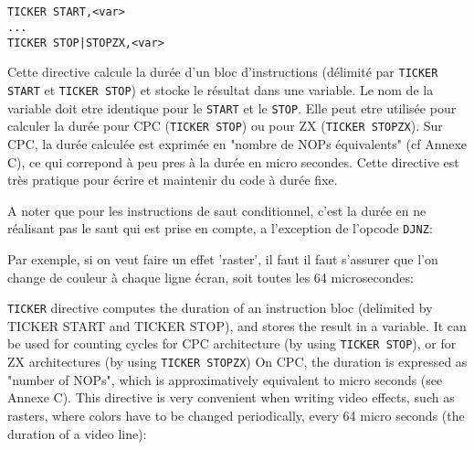 \subsection{}


\subsection{}


\subsection{}



\begin{verbatim}
TICKER START,<var>
...
TICKER STOP|STOPZX,<var>
\end{verbatim}

\begin{xfr}
Cette directive calcule la durée d'un bloc d'instructions (délimité par \texttt{TICKER START} et \texttt{TICKER STOP})
et stocke le résultat dans une variable. Le nom de la variable doit etre identique pour le \texttt{START} et le \texttt{STOP}.
Elle peut etre utilisée pour calculer la durée pour CPC (\texttt{TICKER STOP}) ou pour ZX (\texttt{TICKER STOPZX}).
Sur CPC, la durée calculée est exprimée en "nombre de NOPs équivalents" (cf Annexe C), ce qui correpond à peu pres à la durée en micro secondes. Cette directive est très pratique pour écrire et maintenir du code à durée fixe.

A noter que pour les instructions de saut conditionnel, c'est la durée en ne réalisant pas le saut qui est prise en compte, a l'exception de l'opcode \texttt{DJNZ}:


Par exemple, si on veut faire un effet 'raster', il faut il faut s'assurer que l'on change de couleur à chaque ligne écran, soit toutes les 64 microsecondes:
\end{xfr}

\begin{xen}
\texttt{TICKER} directive computes the duration of an instruction bloc (delimited by TICKER START and TICKER STOP),
and stores the result in a variable.
It can be used for counting cycles for CPC architecture (by using \texttt{TICKER STOP}), or for ZX architectures (by using \texttt{TICKER STOPZX})
On CPC, the duration is expressed as "number of NOPs", which is approximatively equivalent to micro seconds (see Annexe C).
This directive is very convenient when writing video effects, such as rasters, where colors have to be changed periodically, every 64 micro seconds (the duration of a video line):
\end{xen}

